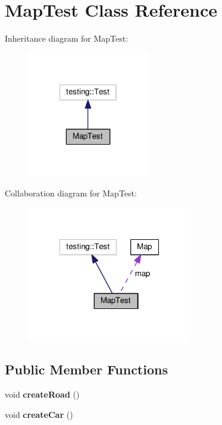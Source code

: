 \hypertarget{classMapTest}{\section{Map\-Test Class Reference}
\label{classMapTest}
}


Inheritance diagram for Map\-Test\-:
\nopagebreak
\begin{figure}[H]
\begin{center}
\leavevmode
\includegraphics[width=150pt]{classMapTest__inherit__graph}
\end{center}
\end{figure}


Collaboration diagram for Map\-Test\-:
\nopagebreak
\begin{figure}[H]
\begin{center}
\leavevmode
\includegraphics[width=203pt]{classMapTest__coll__graph}
\end{center}
\end{figure}
\subsection*{Public Member Functions}
\begin{DoxyCompactItemize}
\item 
\hypertarget{classMapTest_a494357a00f24b125e3b44bfebf0d4f9f}{void {\bfseries create\-Road} ()}\label{classMapTest_a494357a00f24b125e3b44bfebf0d4f9f}

\item 
\hypertarget{classMapTest_a6d77b0e6e116ddeff2813cea0a65600e}{void {\bfseries create\-Car} ()}\label{classMapTest_a6d77b0e6e116ddeff2813cea0a65600e}

\end{DoxyCompactItemize}

